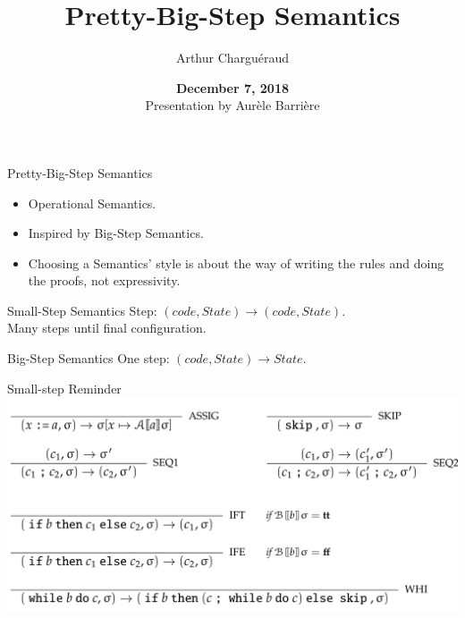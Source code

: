 \documentclass[page number,dvipsnames]{beamer}
\def\outline{
  \begin{frame}[plain,noframenumbering]
    \frametitle{Outline}
    \tableofcontents[currentsection]
  \end{frame}
}
\begin{document}
\title[Pretty Big Step]{Pretty-Big-Step Semantics}
\author{Arthur Chargu\'eraud}

\date{\textbf{December 7, 2018}\\
Presentation by Aur\`ele Barri\`ere}

\def\outline{
  \begin{frame}[plain,noframenumbering]
    \frametitle{Outline}
    \tableofcontents[currentsection]
  \end{frame}
}

\begin{frame}
  \vspace{-2cm}
  \maketitle
  \vspace{-4cm}
\end{frame}



\begin{frame}{Pretty-Big-Step Semantics}
  \begin{itemize}
  \item Operational Semantics.
  \item Inspired by Big-Step Semantics.
  \item Choosing a Semantics' style is about the way of writing the rules and doing the proofs, not expressivity.
  \end{itemize}
  \vfill
  \begin{alertblock}{Small-Step Semantics}
    Step: $(\mathit{code},\mathit{State})\rightarrow(\mathit{code},\mathit{State})$.\\
    Many steps until final configuration.
  \end{alertblock}
  \vfill
  \begin{exampleblock}{Big-Step Semantics}
    One step: $(\mathit{code},\mathit{State})\rightarrow\mathit{State}$.
  \end{exampleblock}
  
\end{frame}

\begin{frame}{Small-step Reminder}
  \center
  \includegraphics[scale=0.2]{smallstep.png}
\end{frame}
\end{document}

